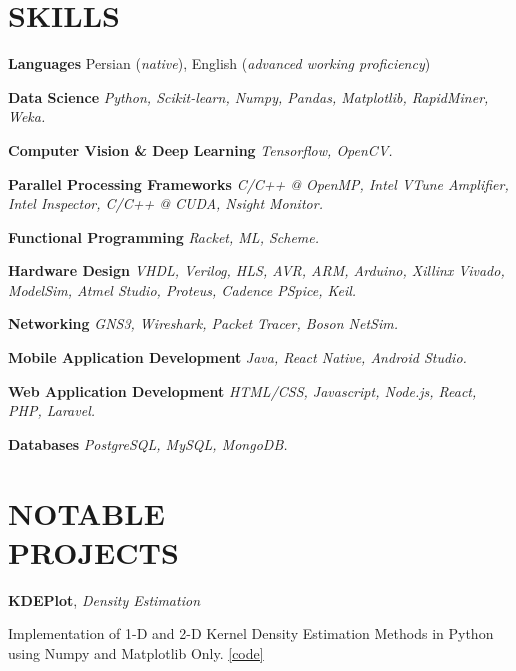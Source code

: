 \documentclass[margin, 10pt]{res} %
\begin{document}
	\section{SKILLS}
	
	\textbf{Languages }
	Persian (\emph{native}), English (\emph{advanced working proficiency})
	
	\textbf{Data Science}
	\textit{Python, Scikit-learn, Numpy, Pandas, Matplotlib, RapidMiner, Weka.}
	
	\textbf{Computer Vision \& Deep Learning}
	\textit{Tensorflow, OpenCV.}
	
	\textbf{Parallel Processing Frameworks}
	\textit{C/C++ @ OpenMP, Intel VTune Amplifier, Intel Inspector, C/C++ @ CUDA, Nsight Monitor.}
	
	\textbf{Functional Programming}
	\textit{Racket, ML, Scheme.}

	\textbf{Hardware Design}
	\textit{VHDL, Verilog, HLS, AVR, ARM, Arduino, Xillinx Vivado, ModelSim, Atmel Studio, Proteus, Cadence PSpice, Keil.}
	
	\textbf{Networking}
	\textit{GNS3, Wireshark, Packet Tracer, Boson NetSim.}

	\textbf{Mobile Application Development}
	\textit{Java, React Native, Android Studio.}
	
	
	\textbf{Web Application Development}
	\textit{HTML/CSS, Javascript, Node.js, React, PHP, Laravel.}
	
	\textbf{Databases}
	\textit{PostgreSQL, MySQL, MongoDB.}
	

\section{NOTABLE \\ PROJECTS}

	\textbf{KDEPlot}, 
\textit{Density Estimation}
\begin{innerlist}
	\item Implementation of 1-D and 2-D Kernel Density Estimation Methods in Python using Numpy and Matplotlib Only.
	\hfill{\UrlFont\href{https://github.com/aligholamee/KDEPlot}{[code]}}
\end{innerlist}
\end{document}
